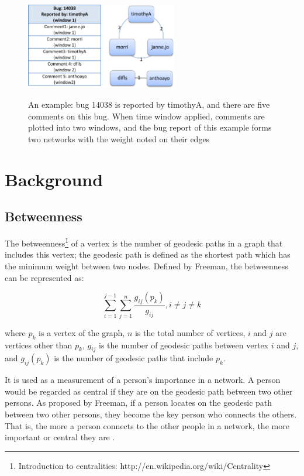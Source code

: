 \documentclass[10pt, conference, compsocconf]{IEEEtran}
\begin{document}

\begin{figure}[!t]
\centerline{\includegraphics[width=2.6in,height = 3.8cm]{graph.png}
\label{graph}}
\caption{An example: bug 14038 is reported by timothyA, and there are
  five comments on this bug. 
When time window applied, comments are plotted into two windows, and
the bug report of this example forms two networks with the weight
noted on their edges}

\end{figure}

\section{Background}
\label{background}
\subsection{Betweenness}

The betweenness\footnote[2]{Introduction to centralities: http://en.wikipedia.org/wiki/Centrality} of a vertex is the number of geodesic paths in a graph that includes this vertex; the geodesic path is defined as the shortest path which has the minimum weight between two nodes. 
Defined by Freeman, the betweenness can be represented as:

\begin{equation} 
\sum_{i=1}^{j-1}\sum_{j=1}^{n}\frac{g_{ij}(p_k)}{g_{ij}}, i\neq j \neq k
\end{equation}

where $p_k$ is a vertex of the graph, $n$ is the total number of vertices, $i$ and $j$ are vertices other than $p_k$, $g_{ij}$ is the number of geodesic paths between vertex $i$ and $j$, and $g_{ij}(p_k)$ is the number of geodesic paths that include $p_k$.

It is used as a measurement of a person's importance in a network. A person would be regarded as central if they are on the geodesic path between two other persons. As proposed by Freeman, if a person locates on the geodesic path between two other persons, they become the key person who connects the others. That is, the more a person connects to the other people in a network, the more important or central they are \cite{BOOK:han}.
\end{document}
